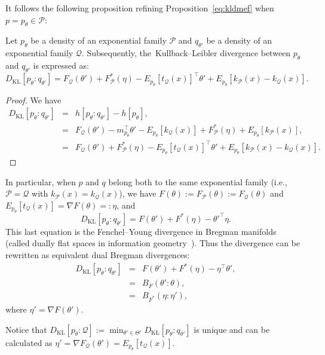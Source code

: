 \documentclass[entropy,article,accept,oneauthor,pdftex,entropy]{Definitions/mdpi}
\def\calQ{\mathcal{Q}}
\def\KL{\mathrm{KL}}
\def\calQ{\mathcal{Q}}
\def\calP{\mathcal{P}}
\begin{document}
\begin{paracol}{2}
It follows the following proposition refining Proposition~\ref{eq:kldmef} when $p=p_\theta\in\calP$:

\begin{Proposition}\label{eq:klddiffef}
Let $p_{\theta}$ be a density of an exponential family $\calP$ and
 $q_{\theta'}$ be a density of an exponential family $\calQ$. 
Subsequently, the~Kullback--Leibler divergence between $p_{\theta}$ and $q_{\theta'}$ is expressed  as:
\begin{equation}\label{eq:htimesk}
D_\KL[p_{\theta}:q_{\theta'}] = 
F_\calQ(\theta')+F_\calP^*(\eta)-E_{p_{\theta}}[t_\calQ(x)]^\top\theta' +E_{p_{\theta}}[k_\calP(x)-k_\calQ(x)].
\end{equation}
\end{Proposition}


\begin{proof}
We have
\begin{eqnarray}
D_\KL[p_{\theta}:q_{\theta'}] &=& h[p_{\theta}:q_{\theta'}]-h[p_{\theta}],\\
&=&  F_\calQ(\theta')-m_{p_\theta}^\top\theta'-E_{p_{\theta}}[k_\calQ(x)] + F^*_\calP(\eta)+E_{p_{\theta}}[k_\calP(x)],\\
&=& F_\calQ(\theta') + F^*_\calP(\eta)- E_{p_{\theta}}[t_\calQ(x)]^\top \theta' +E_{p_{\theta}}[k_\calP(x)-k_\calQ(x)].
\end{eqnarray}
\end{proof}

 

In particular, when $p$ and $q$ belong both to the same exponential family (i.e., $\calP=\calQ$ with $k_\calP(x)=k_\calQ(x)$), we have $F(\theta):=F_\calP(\theta):=F_\calQ(\theta)$ and $
E_{p_{\theta}}[t_\calQ(x)]=\nabla F(\theta)=:\eta$, and~
$$
D_\KL[p_{\theta}:q_{\theta'}]=F(\theta')+F^*(\eta)-\theta'^\top\eta.
$$
This last equation is the Fenchel--Young divergence in Bregman manifolds~\cite{FenchelYoung-2020,BregmanManifold-2021} (called dually flat spaces in information geometry~\cite{IG-2016}).
Thus the divergence can be rewritten as equivalent dual Bregman divergences:
\begin{eqnarray}
D_\KL[p_{\theta}:q_{\theta'}] &=& F(\theta')+F^*(\eta)-\eta^\top\theta',\\
&=& B_F(\theta':\theta),\\
&=& B_{F^*}(\eta:\eta'),
\end{eqnarray}
where $\eta'=\nabla F(\theta')$.


Notice that $D_\KL[p_\theta:\calQ]:=\min_{\theta'\in\Theta'} D_\KL[p_\theta:q_{\theta'}]$ is unique 
and can be calculated as $\eta'=\nabla F_\calQ(\theta')=E_{p_\theta}[t_\calQ(x)]$.



\end{paracol}
\end{document}
